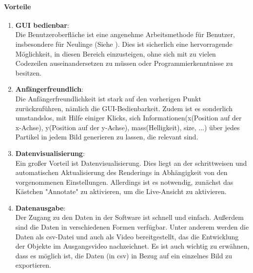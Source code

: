 	\paragraph{Vorteile}
		\begin{enumerate}
    			\item \textbf{GUI bedienbar}: \\
				Die Benutzeroberfläche ist eine angenehme Arbeitsmethode  für Benutzer, insbesondere für Neulinge (Siehe \cite{hertzum1996browsing}). Dies ist sicherlich eine hervorragende Möglichkeit, in diesen Bereich einzusteigen, ohne sich mit zu vielen Codezeilen auseinandersetzen zu müssen oder Programmierkenntnisse zu besitzen.
				
    			\item \textbf{Anfängerfreundlich}:\\
				Die Anfängerfreundlichkeit ist stark auf den vorherigen Punkt zurückzuführen, nämlich die GUI-Bedienbarkeit. Zudem ist es sonderlich umstandslos, mit Hilfe einiger Klicks, sich Informationen(x(Position auf der x-Achse), y(Position auf der y-Achse), mass(Helligkeit), size, ...) über jedes Partikel in jedem Bild generieren zu lassen, die relevant sind.    
				
    			\item \textbf{Datenvisualisierung}:\\
    			Ein großer Vorteil ist Datenvisualisierung. Dies liegt an der schrittweisen und automatischen Aktualisierung des Renderings in Abhängigkeit von den vorgenommenen Einstellungen. Allerdings ist es notwendig, zunächst das Kästchen "Annotate" zu aktivieren, um die Live-Ansicht zu aktivieren.
    			
    			\item \textbf{Datenausgabe}:\\
 				Der Zugang zu den Daten in der Software ist schnell und einfach. Außerdem sind die Daten in verschiedenen Formen verfügbar. Unter anderem werden die Daten als csv-Datei und auch als Video bereitgestellt, das die Entwicklung der Objekte im Ausgangsvideo nachzeichnet. 
Es ist auch wichtig zu erwähnen, dass es möglich ist, die Daten (in csv) in Bezug auf ein einzelnes Bild zu exportieren.
		\end{enumerate}
		
